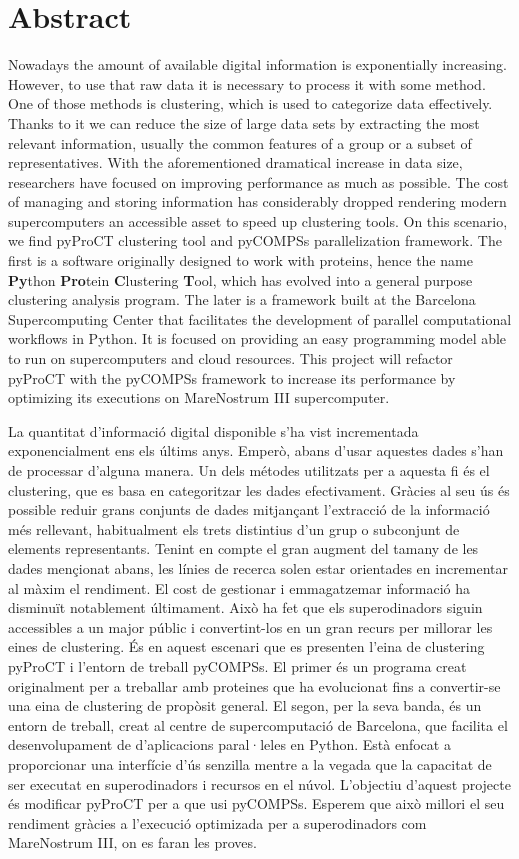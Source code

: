 \chapter{Abstract}

Nowadays the amount of available digital information is exponentially increasing. However, to use that raw data it is necessary to process it with some method. One of those methods is clustering, which is used to categorize data effectively. Thanks to it we can reduce the size of large data sets by extracting the most relevant information, usually the common features of a group or a subset of representatives. With the aforementioned dramatical increase in data size, researchers have focused on improving performance as much as possible. The cost of managing and storing information has considerably dropped rendering modern supercomputers an accessible asset to speed up clustering tools. On this scenario, we find pyProCT clustering tool and pyCOMPSs parallelization framework. The first is a software originally designed to work with proteins, hence the name \textbf{Py}thon \textbf{Pro}tein \textbf{C}lustering \textbf{T}ool, which has evolved into a general purpose clustering analysis program. The later is a framework built at the Barcelona Supercomputing Center that facilitates the development of parallel computational workflows in Python. It is focused on providing an easy programming model able to run on supercomputers and cloud resources. This project will refactor pyProCT with the pyCOMPSs framework to increase its performance by optimizing its executions on MareNostrum III supercomputer.

La quantitat d'informació digital disponible s'ha vist incrementada exponencialment ens els últims anys. Emperò, abans d'usar aquestes dades s'han de processar d'alguna manera. Un dels métodes utilitzats per a aquesta fi és el clustering, que es basa en categoritzar les dades efectivament. Gràcies al seu ús és possible reduir grans conjunts de dades mitjançant l'extracció de la informació més rellevant, habitualment els trets distintius d'un grup o subconjunt de elements representants. Tenint en compte el gran augment del tamany de les dades mençionat abans, les línies de recerca solen estar orientades en incrementar al màxim el rendiment. El cost de gestionar i emmagatzemar informació ha disminuït notablement últimament. Això ha fet que els superodinadors siguin accessibles  a un major públic i convertint-los en un gran recurs per millorar les eines de clustering. És en aquest escenari que es presenten l'eina de clustering pyProCT i l'entorn de treball pyCOMPSs. El primer és un programa creat originalment per a treballar amb proteines que ha evolucionat fins a convertir-se una eina de clustering de propòsit general. El segon, per la seva banda, és un entorn de treball, creat al centre de supercomputació de Barcelona, que facilita el desenvolupament de d'aplicacions paral·leles en Python. Està enfocat a proporcionar una interfície d'ús senzilla mentre a la vegada que la capacitat de ser executat en superodinadors i recursos en el núvol. L'objectiu d'aquest projecte és modificar pyProCT per a que usi pyCOMPSs. Esperem que això millori el seu rendiment gràcies a l'execució optimizada per a superodinadors com MareNostrum III, on es faran les proves.